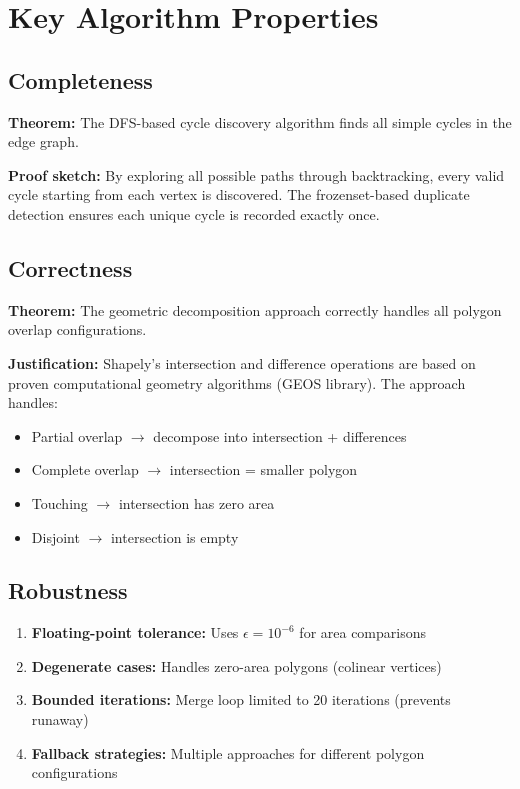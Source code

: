 \documentclass[11pt]{article}
\begin{document}
\section{Key Algorithm Properties}

\subsection{Completeness}

\textbf{Theorem:} The DFS-based cycle discovery algorithm finds all simple cycles in the edge graph.

\textbf{Proof sketch:} By exploring all possible paths through backtracking, every valid cycle starting from each vertex is discovered. The frozenset-based duplicate detection ensures each unique cycle is recorded exactly once.

\subsection{Correctness}

\textbf{Theorem:} The geometric decomposition approach correctly handles all polygon overlap configurations.

\textbf{Justification:} Shapely's intersection and difference operations are based on proven computational geometry algorithms (GEOS library). The approach handles:
\begin{itemize}
    \item Partial overlap $\rightarrow$ decompose into intersection + differences
    \item Complete overlap $\rightarrow$ intersection = smaller polygon
    \item Touching $\rightarrow$ intersection has zero area
    \item Disjoint $\rightarrow$ intersection is empty
\end{itemize}

\subsection{Robustness}

\begin{enumerate}
    \item \textbf{Floating-point tolerance:} Uses $\epsilon = 10^{-6}$ for area comparisons
    \item \textbf{Degenerate cases:} Handles zero-area polygons (colinear vertices)
    \item \textbf{Bounded iterations:} Merge loop limited to 20 iterations (prevents runaway)
    \item \textbf{Fallback strategies:} Multiple approaches for different polygon configurations
\end{enumerate}
\end{document}
